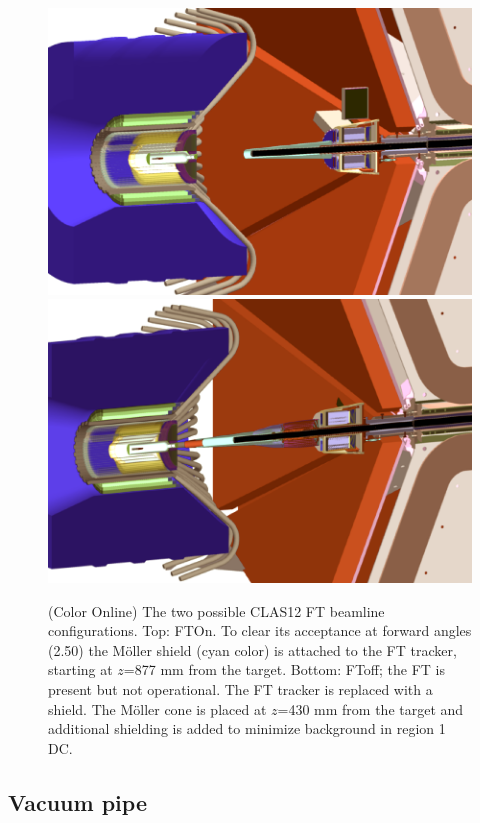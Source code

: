 \begin{figure}
	\centering
	\includegraphics[width=0.99\columnwidth,keepaspectratio]{img/ftOnGeometry.png}
	\includegraphics[width=0.99\columnwidth,keepaspectratio]{img/ftOffGeometry.png}
	\caption{(Color Online) The two possible CLAS12 FT beamline configurations. Top: FTOn. To clear its acceptance at forward angles (2.50\mdeg)
             the M\"oller shield (cyan color) is attached to the FT tracker, starting at $z$=877 mm from the target.
             Bottom: FToff; the FT is present but not operational. The FT tracker is replaced with a shield.
             The M\"oller cone is placed at $z$=430 mm from the target and additional shielding
             is added to minimize background in region 1 DC.}
	\label{fig:beamlineGeometry}
\end{figure}

\subsection{Vacuum pipe}

